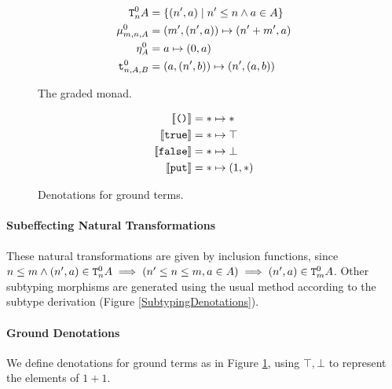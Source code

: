\begin{figure}
    \centering
    \begin{minipage}[t]{0.45\linewidth}
        \begin{framed}
            \begin{align*}
                \texttt{T}^0_{n}A & = \{(n', a) \mid n'\leq n\wedge a\in A \}\\
                \mu_{m, n, A}^0 & = (m', (n', a))\mapsto (n' + m', a)\\
                \eta_{A}^0 & = a\mapsto (0, a)\\
                \texttt{t}_{n, A, B}^0 & = (a, (n', b)) \mapsto (n', (a, b))
            \end{align*}
        \end{framed}
        \caption{The graded monad.}
        \label{AdequacyGradedMonad}
    \end{minipage}\quad
    \begin{minipage}[t]{0.45\linewidth}
        \begin{framed}
            \begin{align*}
                \deno{\u} & = \singleton\mapsto \singleton\\
                \deno{\t} & = \singleton\mapsto \top\\
                \deno{\f} & = \singleton\mapsto \bot\\
                \deno{\put} & = \singleton\mapsto (1, \singleton)
            \end{align*}
            \end{framed}
            
                \caption{Denotations for ground terms.}
                \label{PECPUTGroundDenotations}
    \end{minipage}
\end{figure}


   


\paragraph{Subeffecting Natural Transformations}
These natural transformations are given by inclusion functions, since $n\leq m\wedge (n',a)\in\texttt{T}^0_{n}A \implies (n'\leq n \leq m, a\in A)\implies (n',a)\in\texttt{T}^0_{m}A$. Other subtyping morphisms are generated using the usual method according to the subtype derivation (Figure \ref{SubtypingDenotations}).

\paragraph{Ground Denotations}
We define denotations for ground terms as in Figure \ref{PECPUTGroundDenotations}, using $\top, \bot$ to represent the elements of $1+1$.






